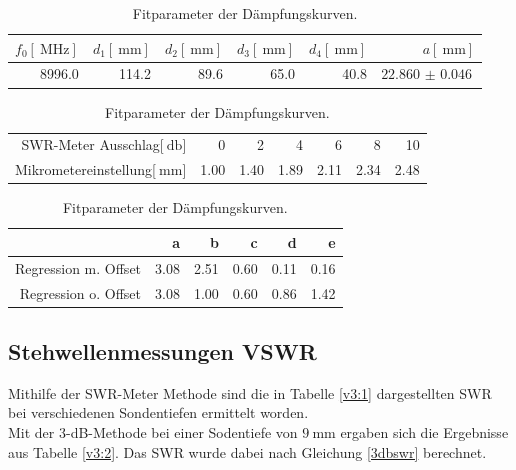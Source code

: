 \begin{table}
\centering
\caption{Messwerte zur Bestimmung der Klystronfrequenz.}
\begin{tabular}{r r r r r r}
	$f_\text{0}[\SI{}{\mega\hertz}]$ & $d_\text{1}[\SI{}{\milli\meter}]$ & $d_\text{2}[\SI{}{\milli\meter}]$ & $d_\text{3}[\SI{}{\milli\meter}]$ & $d_\text{4}[\SI{}{\milli\meter}]$ & $a[\SI{}{\milli\meter}]$\\
	\hline
	\hline
	8996.0 & 114.2 & 89.6 & 65.0 & 40.8 & $\SI{22.860(46)}{}$\\
	\hline
\end{tabular}
\label{v2:1}
\caption{Messwerte zur Bestimmung Dämpfungskurve.}
\begin{tabular}{r|r r r r r r|}
	SWR-Meter Ausschlag[$\SI{}{\decibel}$] & 0 & 2 & 4 & 6 & 8 & 10\\
	Mikrometereinstellung[$\SI{}{\milli\meter}$] & 1.00 & 1.40 & 1.89 & 2.11 & 2.34 & 2.48\\
\end{tabular}
\label{v2:2}
\caption{Fitparameter der Dämpfungskurven.}
\begin{tabular}{r r r r r r}
	 & a & b & c & d & e\\
	\hline
	\hline
	Regression m. Offset & 3.08 & 2.51 & 0.60 & 0.11 & 0.16\\
	Regression o. Offset & 3.08 & 1.00 & 0.60 & 0.86 & 1.42\\
	\hline
\end{tabular}
\label{v2:3}
\end{table}

\FloatBarrier

\subsection{Stehwellenmessungen VSWR} %
\label{sec:stehwellenmessungen_vswr}

Mithilfe der SWR-Meter Methode sind die in Tabelle \ref{v3:1} dargestellten SWR bei verschiedenen Sondentiefen ermittelt worden.\\

Mit der 3-dB-Methode bei einer Sodentiefe von $\SI{9}{\milli\meter}$ ergaben sich die Ergebnisse aus Tabelle \ref{v3:2}.
Das SWR wurde dabei nach Gleichung \eqref{3dbswr} berechnet.\\

